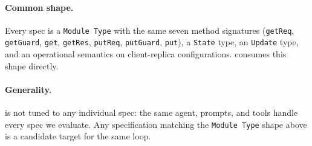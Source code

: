 \paragraph{Common shape.}
Every spec is a \coq{} \texttt{Module Type} with the same seven method signatures (\texttt{getReq}, \texttt{getGuard}, \texttt{get}, \texttt{getRes}, \texttt{putReq}, \texttt{putGuard}, \texttt{put}), a \texttt{State} type, an \texttt{Update} type, and an operational semantics on client-replica configurations. \sys{} consumes this shape directly.

\paragraph{Generality.}
\sys{} is not tuned to any individual spec: the same agent, prompts, and tools handle every spec we evaluate. Any specification matching the \texttt{Module Type} shape above is a candidate target for the same loop.

